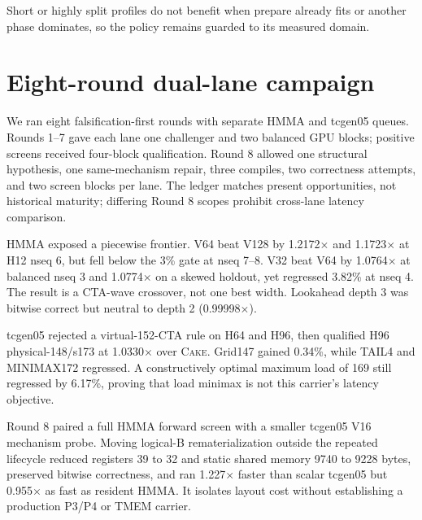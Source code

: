 \documentclass[11pt]{article}
\newcommand{\cake}{\textsc{Cake}}
\begin{document}
Short or highly split profiles do not benefit when prepare already fits or another phase dominates, so the policy remains guarded to its measured domain.

\section{Eight-round dual-lane campaign}

We ran eight falsification-first rounds with separate HMMA and tcgen05 queues. Rounds 1--7 gave each lane one challenger and two balanced GPU blocks; positive screens received four-block qualification. Round 8 allowed one structural hypothesis, one same-mechanism repair, three compiles, two correctness attempts, and two screen blocks per lane. The ledger matches present opportunities, not historical maturity; differing Round 8 scopes prohibit cross-lane latency comparison.

HMMA exposed a piecewise frontier. V64 beat V128 by 1.2172$\times$ and 1.1723$\times$ at H12 nseq 6, but fell below the 3\% gate at nseq 7--8. V32 beat V64 by 1.0764$\times$ at balanced nseq 3 and 1.0774$\times$ on a skewed holdout, yet regressed 3.82\% at nseq 4. The result is a CTA-wave crossover, not one best width. Lookahead depth 3 was bitwise correct but neutral to depth 2 (0.99998$\times$).

tcgen05 rejected a virtual-152-CTA rule on H64 and H96, then qualified H96 physical-148/s173 at 1.0330$\times$ over \cake{}. Grid147 gained 0.34\%, while TAIL4 and MINIMAX172 regressed. A constructively optimal maximum load of 169 still regressed by 6.17\%, proving that load minimax is not this carrier's latency objective.

Round 8 paired a full HMMA forward screen with a smaller tcgen05 V16 mechanism probe. Moving logical-B rematerialization outside the repeated lifecycle reduced registers 39 to 32 and static shared memory 9740 to 9228 bytes, preserved bitwise correctness, and ran 1.227$\times$ faster than scalar tcgen05 but 0.955$\times$ as fast as resident HMMA. It isolates layout cost without establishing a production P3/P4 or TMEM carrier.
\end{document}
